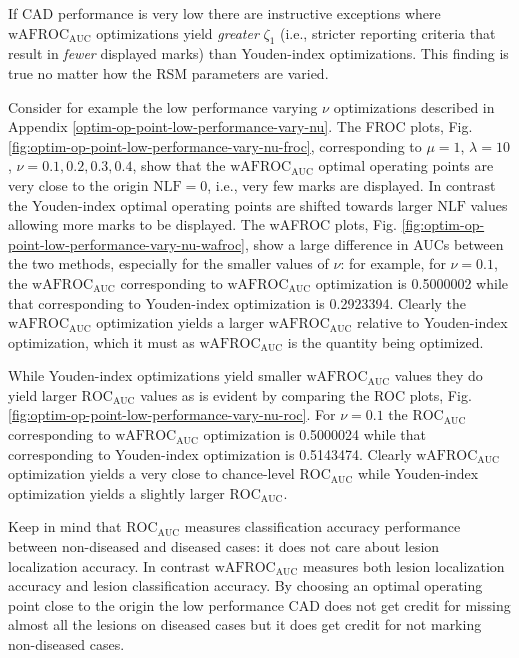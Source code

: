 \documentclass[
]{book}
\begin{document}
If CAD performance is very low there are instructive exceptions where \(\text{wAFROC}_\text{AUC}\) optimizations yield \emph{greater} \(\zeta_1\) (i.e., stricter reporting criteria that result in \emph{fewer} displayed marks) than Youden-index optimizations. This finding is true no matter how the RSM parameters are varied.

Consider for example the low performance varying \(\nu\) optimizations described in Appendix \ref{optim-op-point-low-performance-vary-nu}. The FROC plots, Fig. \ref{fig:optim-op-point-low-performance-vary-nu-froc}, corresponding to \(\mu = 1\), \(\lambda = 10\), \(\nu = 0.1, 0.2, 0.3, 0.4\), show that the \(\text{wAFROC}_\text{AUC}\) optimal operating points are very close to the origin \(\text{NLF} = 0\), i.e., very few marks are displayed. In contrast the Youden-index optimal operating points are shifted towards larger \(\text{NLF}\) values allowing more marks to be displayed. The wAFROC plots, Fig. \ref{fig:optim-op-point-low-performance-vary-nu-wafroc}, show a large difference in AUCs between the two methods, especially for the smaller values of \(\nu\): for example, for \(\nu=0.1\), the \(\text{wAFROC}_\text{AUC}\) corresponding to \(\text{wAFROC}_\text{AUC}\) optimization is 0.5000002 while that corresponding to Youden-index optimization is 0.2923394. Clearly the \(\text{wAFROC}_\text{AUC}\) optimization yields a larger \(\text{wAFROC}_\text{AUC}\) relative to Youden-index optimization, which it must as \(\text{wAFROC}_\text{AUC}\) is the quantity being optimized.

While Youden-index optimizations yield smaller \(\text{wAFROC}_\text{AUC}\) values they do yield larger \(\text{ROC}_\text{AUC}\) values as is evident by comparing the ROC plots, Fig. \ref{fig:optim-op-point-low-performance-vary-nu-roc}. For \(\nu=0.1\) the \(\text{ROC}_\text{AUC}\) corresponding to \(\text{wAFROC}_\text{AUC}\) optimization is 0.5000024 while that corresponding to Youden-index optimization is 0.5143474. Clearly \(\text{wAFROC}_\text{AUC}\) optimization yields a very close to chance-level \(\text{ROC}_\text{AUC}\) while Youden-index optimization yields a slightly larger \(\text{ROC}_\text{AUC}\).

Keep in mind that \(\text{ROC}_\text{AUC}\) measures classification accuracy performance between non-diseased and diseased cases: it does not care about lesion localization accuracy. In contrast \(\text{wAFROC}_\text{AUC}\) measures both lesion localization accuracy and lesion classification accuracy. By choosing an optimal operating point close to the origin the low performance CAD does not get credit for missing almost all the lesions on diseased cases but it does get credit for not marking non-diseased cases.
\end{document}
